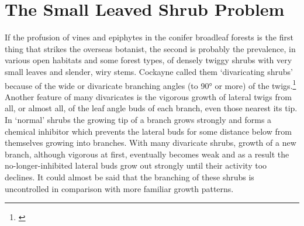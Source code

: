 \chapter{The Small Leaved Shrub Problem}

If the profusion of vines and epiphytes in the conifer broadleaf forests is the first thing that strikes the overseas botanist, the second is probably the prevalence, in various open habitats and some forest types, of densely twiggy shrubs with very small leaves and slender, wiry stems.
Cockayne called them `divaricating shrubs' because of the wide or divaricate branching angles (to \ang{90} or more) of the twigs.\footnote{\cite{cockayne1912observations}}
Another feature of many divaricates is the vigorous growth of lateral twigs from all, or almost all, of the leaf angle buds of each branch, even those nearest its tip.
In `normal' shrubs the growing tip of a branch grows strongly and forms a chemical inhibitor which prevents the lateral buds for some distance below from themselves growing into branches.
With many divaricate shrubs, growth of a new branch, although vigorous at first, eventually becomes weak and as a result the no-longer-inhibited lateral buds grow out strongly until their activity too declines.
It could almost be said that the branching of these shrubs is uncontrolled in comparison with more familiar growth patterns.
